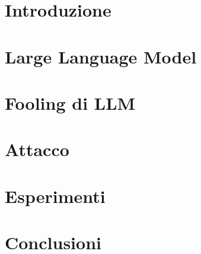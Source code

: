 \documentclass[12pt,a4paper]{report}
\begin{document}






\clearpage
\thispagestyle{empty}
\hfill
\clearpage

\clearpage
\thispagestyle{empty}
\hfill
\clearpage

\clearpage{\pagestyle{empty}\cleardoublepage}

\tableofcontents                        %
\listoffigures  


\chapter{Introduzione}


\chapter{Large Language Model}


\chapter{Fooling di LLM}


\chapter{Attacco}


\chapter{Esperimenti}



\chapter{Conclusioni}


\renewcommand{\chaptermark}[1]{\markright{\thechapter \ #1}{}}
\lhead[\fancyplain{}{\bfseries\thepage}]{\fancyplain{}{\bfseries\rightmark}}
\end{document}
